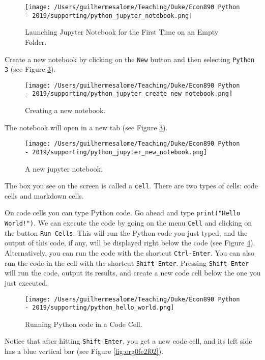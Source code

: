 \documentclass[12pt, a4paper]{article}
\begin{document}
\begin{figure}[htbp]
\centering
\texttt{[image: /Users/guilhermesalome/Teaching/Duke/Econ890 Python - 2019/supporting/python\_jupyter\_notebook.png]}
\caption{\label{fig:org3cb8600}
Launching Jupyter Notebook for the First Time on an Empty Folder.}
\end{figure}

Create a new notebook by clicking on the \texttt{New} button and then selecting \texttt{Python 3} (see Figure \ref{fig:org787f0a9}).
\begin{figure}[htbp]
\centering
\texttt{[image: /Users/guilhermesalome/Teaching/Duke/Econ890 Python - 2019/supporting/python\_jupyter\_create\_new\_notebook.png]}
\caption{\label{fig:orge8584c8}
Creating a new notebook.}
\end{figure}

The notebook will open in a new tab (see Figure \ref{fig:org787f0a9}).

\begin{figure}[htbp]
\centering
\texttt{[image: /Users/guilhermesalome/Teaching/Duke/Econ890 Python - 2019/supporting/python\_jupyter\_new\_notebook.png]}
\caption{\label{fig:org787f0a9}
A new jupyter notebook.}
\end{figure}

The box you see on the screen is called a \texttt{cell}.
There are two types of cells: code cells and markdown cells.

On code cells you can type Python code.
Go ahead and type \texttt{print("Hello World!")}.
We can execute the code by going on the menu \texttt{Cell} and clicking on the button \texttt{Run Cells}.
This will run the Python code you just typed, and the output of this code, if any, will be displayed right below the code (see Figure \ref{fig:org9a6797a}).
Alternatively, you can run the code with the shortcut \texttt{Ctrl-Enter}.
You can also run the code in the cell with the shortcut \texttt{Shift-Enter}.
Pressing \texttt{Shift-Enter} will run the code, output its results, and create a new code cell below the one you just executed.

\begin{figure}[htbp]
\centering
\texttt{[image: /Users/guilhermesalome/Teaching/Duke/Econ890 Python - 2019/supporting/python\_hello\_world.png]}
\caption{\label{fig:org9a6797a}
Running Python code in a Code Cell.}
\end{figure}

Notice that after hitting \texttt{Shift-Enter}, you get a new code cell, and its left side has a blue vertical bar (see Figure \ref{fig:org0fe2f02}).
\end{document}
